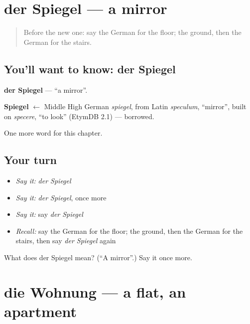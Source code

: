 \section[der Spiegel]{der Spiegel — a mirror}

\label{lesson:GE-C78-spiegel}



\begin{quote}
Before the new one: say the German for the floor; the ground, then the German for the stairs.
\end{quote}

\subsection*{You'll want to know: der Spiegel}
\textbf{der Spiegel} — \textquotedblleft{}a mirror\textquotedblright{}.

\begin{cousinweb}
\textbf{Spiegel} $\leftarrow$ Middle High German \emph{spiegel}, from Latin \emph{speculum}, \textquotedblleft{}mirror\textquotedblright{}, built on \emph{specere}, \textquotedblleft{}to look\textquotedblright{} (EtymDB 2.1) — borrowed.
\end{cousinweb}

\begin{grammarlens}[title={What you've built}]
One more word for this chapter.
\end{grammarlens}

\subsection*{Your turn}
\begin{itemize}
\raggedright
  \item \emph{Say it:} \emph{der Spiegel}
  \item \emph{Say it:} \emph{der Spiegel}, once more
  \item \emph{Say it:} say \emph{der Spiegel}
  \item \emph{Recall:} say the German for the floor; the ground, then the German for the stairs, then say \emph{der Spiegel} again
\end{itemize}

\begin{tcolorbox}[breakable,colback=teal!4,colframe=teal!35!black,title={Before you move on}]
What does der Spiegel mean? (\textquotedblleft{}A mirror\textquotedblright{}.) Say it once more.
\end{tcolorbox}
\section[die Wohnung]{die Wohnung — a flat, an apartment}

